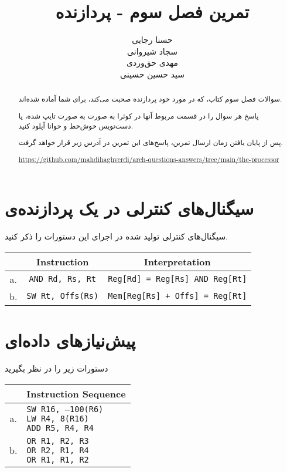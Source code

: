 \documentclass[11pt, dvipsnames, svgnames, x11names]{article}
\title{تمرین فصل سوم - پردازنده}
\author{
حسنا رجایی \\
    سجاد شیروانی \\
    مهدی‌ حق‌وردی \\
سید حسین حسینی}
\date{}
\begin{document}
\maketitle    
\begin{abstract}        
سوالات فصل سوم کتاب، که در مورد خود پردازنده صحبت می‌کند، برای شما آماده شده‌اند.

پاسخ هر سوال را در قسمت مربوط آنها در کوئرا به صورت  به صورت تایپ‌ شده، یا دست‌نویس خوش‌خط و خوانا آپلود کنید.               

پس از پایان‌ یافتن زمان ارسال تمرین، پاسخ‌های این تمرین در آدرس زیر قرار خواهد گرفت.
\begin{flushleft}
\url{https://github.com/mahdihaghverdi/arch-questions-answers/tree/main/the-processor}
\end{flushleft}

\end{abstract}
\tableofcontents
\section{سیگنال‌های کنترلی در یک پردازنده‌ی }

سیگنال‌های کنترلی تولید شده در اجرای این دستورات را ذکر کنید.
\begin{latin}
\begin{table}[H]
\begin{center}
\begin{tabular}{|c|c|c|}
\hline
& Instruction & Interpretation \\
\hline
a. &
\texttt{AND Rd, Rs, Rt} &
\texttt{Reg[Rd] = Reg[Rs] AND Reg[Rt]} \\
\hline
b. &
\texttt{SW Rt, Offs(Rs)} &
\texttt{Mem[Reg[Rs] + Offs] = Reg[Rt]} \\
\hline
\end{tabular}
\end{center}
\end{table}
\end{latin}

\section{پیش‌نیاز‌‌های داده‌ای}
دستورات زیر را در نظر بگیرید
\begin{latin}
\begin{table}[H]
\begin{center}
\begin{tabular}{|c|l|}
\hline
& Instruction Sequence \\
\hline
a. &
\makecell[l]{\texttt{SW R16, –100(R6)} \\ \texttt{LW  R4, 8(R16)} \\ \texttt{ADD R5, R4, R4}} \\
\hline
b. &
\makecell[l]{\texttt{OR R1, R2, R3} \\ \texttt{OR R2, R1, R4} \\ \texttt{OR R1, R1, R2}}\\
\hline
\end{tabular}
\end{center}
\end{table}
\end{latin}
\end{document}
